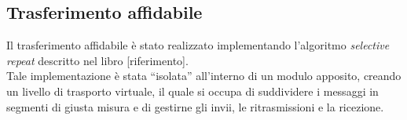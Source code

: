 \subsection{Trasferimento affidabile}
Il trasferimento affidabile è stato realizzato implementando l'algoritmo \emph{selective repeat} descritto nel libro [riferimento].\\
Tale implementazione è stata ``isolata'' all'interno di un modulo apposito, creando un livello di trasporto virtuale,
il quale si occupa di suddividere i messaggi in segmenti di giusta misura e di gestirne gli invii, le ritrasmissioni e la ricezione.





